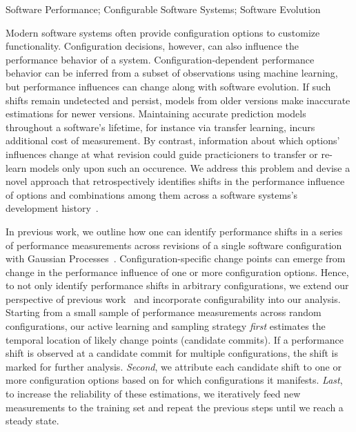 \documentclass[utf8,biblatex]{lni}
\begin{document}
\begin{keywords}
Software Performance; Configurable Software Systems; Software Evolution
\end{keywords}

Modern software systems often provide configuration options to customize functionality. Configuration decisions, however, can also influence the performance behavior of a system. Configuration-dependent performance behavior can be inferred from a subset of observations using machine learning, but performance influences can change along with software evolution. If such shifts remain undetected and persist, models from older versions make inaccurate estimations for newer versions. Maintaining accurate prediction models throughout a software's lifetime, for instance via transfer learning, incurs additional cost of measurement. By contrast, information about which options' influences change at what revision could guide practicioners to transfer or re-learn models only upon such an occurence. 
We address this problem and devise a novel approach that retrospectively identifies shifts in the performance influence of options and combinations among them across a software systems’s development history~\cite{muehlbauer_identifying_2020}. 

In previous work, we outline how one can identify performance shifts in a series of performance measurements across revisions of a single software configuration with Gaussian Processes~\cite{muhlbauer_accurate_2019}. Configuration-specific change points can emerge from change in the performance influence of one or more configuration options. Hence, to not only identify performance shifts in arbitrary configurations, we extend our perspective of previous work~\cite{muhlbauer_accurate_2019} and incorporate  configurability into our analysis. 
Starting from a small sample of performance measurements across random configurations, our active learning and sampling strategy \textit{first} estimates the temporal location of likely change points (candidate commits). If a performance shift is observed at a candidate commit for multiple configurations, the shift is marked for further analysis. \textit{Second}, we attribute each candidate shift to one or more configuration options based on for which configurations it manifests. \textit{Last}, to increase the reliability of these estimations, we iteratively feed new measurements to the training set and repeat the previous steps until we reach a steady state.
	
\end{document}
